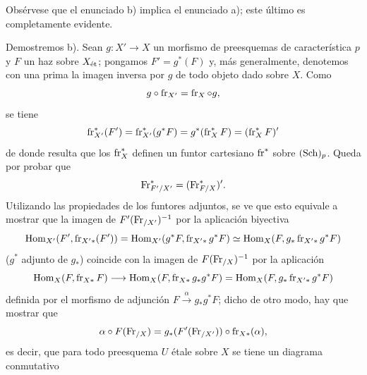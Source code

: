 Obsérvese que el enunciado b) implica el enunciado a); este último es completamente evidente.

Demostremos b). Sean $g:X'\to X$ un morfismo de preesquemas de característica $p$ y $F$ un haz sobre $X_{\mathrm{\acute{e}t}}$; pongamos $F'=g^*(F)$ y, más generalmente, denotemos con una prima la imagen inversa por $g$ de todo objeto dado sobre $X$. Como
\[
g\circ\operatorname{fr}_{X'}=\operatorname{fr}_X\circ g,
\]
se tiene
\[
\operatorname{fr}_{X'}^*(F')=\operatorname{fr}_{X'}^*(g^*F)=g^*(\operatorname{fr}_X^*F)=(\operatorname{fr}_X^*F)'
\]
de donde resulta que los $\operatorname{fr}_X^*$ definen un funtor cartesiano $\operatorname{fr}^*$ sobre $(\operatorname{Sch})_p$. Queda por probar que
\[
\operatorname{Fr}^*_{F'/X'}=(\operatorname{Fr}^*_{F/X})'.
\]
Utilizando las propiedades de los funtores adjuntos, se ve que esto equivale a mostrar que la imagen de $F'(\operatorname{Fr}_{/X'})^{-1}$ por la aplicación biyectiva
\[
\operatorname{Hom}_{X'}(F',\operatorname{fr}_{X'*}(F'))
 =\operatorname{Hom}_{X'}(g^*F,\operatorname{fr}_{X'*}g^*F)
 \simeq \operatorname{Hom}_X(F,g_*\operatorname{fr}_{X'*}g^*F)
\]
($g^*$ adjunto de $g_*$) coincide con la imagen de $F(\operatorname{Fr}_{/X})^{-1}$ por la aplicación
\[
\operatorname{Hom}_X(F,\operatorname{fr}_{X*}F)\longrightarrow
\operatorname{Hom}_X(F,\operatorname{fr}_{X*}g_*g^*F)=
\operatorname{Hom}_X(F,g_*\operatorname{fr}_{X'*}g^*F)
\]
definida por el morfismo de adjunción $F\xrightarrow{\alpha} g_*g^*F$; dicho de otro modo, hay que mostrar que
\[
\alpha\circ F(\operatorname{Fr}_{/X})=g_*(F'(\operatorname{Fr}_{/X'}))\circ\operatorname{fr}_{X*}(\alpha),
\]
es decir, que para todo preesquema $U$ étale sobre $X$ se tiene un diagrama conmutativo

